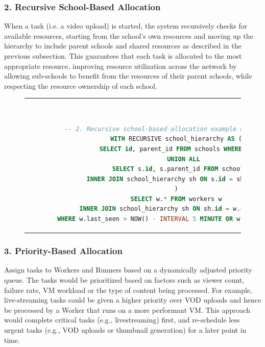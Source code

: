 \subsubsection{2. Recursive School-Based Allocation}
    When a task (i.e. a video upload) is started, the system recursively checks for available resources, starting from the school's own resources and moving up the hierarchy to include parent schools and shared resources as described in the previous subsection. This guarantees that each task is allocated to the most appropriate resource, improving resource utilization across the network by allowing sub-schools to benefit from the resources of their parent schools, while respecting the resource ownership of each school.

    \begin{figure}[htpb]
      \begin{tabular}{c}
      \ \small \begin{lstlisting}[language=SQL]
        -- 2. Recursive school-based allocation example query
        WITH RECURSIVE school_hierarchy AS (
            SELECT id, parent_id FROM schools WHERE id = ?
            UNION ALL
            SELECT s.id, s.parent_id FROM schools s
            INNER JOIN school_hierarchy sh ON s.id = sh.parent_id
        )
        SELECT w.* FROM workers w
        INNER JOIN school_hierarchy sh ON sh.id = w.school_id
        WHERE w.last_seen > NOW() - INTERVAL 5 MINUTE OR w.shared = true;
        \end{lstlisting}
      \end{tabular}
      \label{fig:recursive-allocation}
    \end{figure}

\subsubsection{3. Priority-Based Allocation}
    Assign tasks to Workers and Runners based on a dynamically adjusted priority queue. The tasks would be prioritized based on factors such as viewer count, failure rate, \ac{VM} workload or the type of content being processed. For example, live-streaming tasks could be given a higher priority over \ac{VOD} uploads and hence be processed by a Worker that runs on a more performant \ac{VM}. This approach would complete critical tasks (e.g., livestreaming) first, and re-schedule less urgent tasks (e.g., \ac{VOD} uploads or thumbnail generation) for a later point in time.

